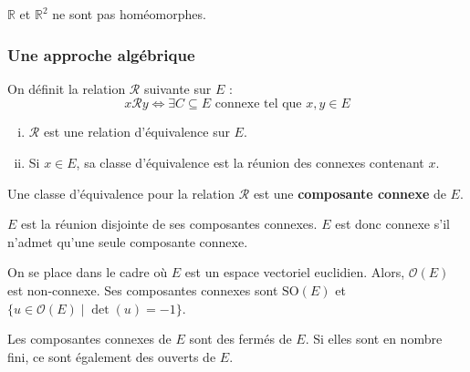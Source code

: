 	\begin{application}
		$\mathbb{R}$ et $\mathbb{R}^2$ ne sont pas homéomorphes.
	\end{application}
	
	\subsubsection{Une approche algébrique}
	
	\begin{definition}
		On définit la relation $\mathcal{R}$ suivante sur $E$ :
		\[ x \mathcal{R} y \iff \exists C \subseteq E \text{ connexe tel que } x, y \in E \]
	\end{definition}
	
	\begin{proposition}
		\begin{enumerate}[(i)]
			\item $\mathcal{R}$ est une relation d'équivalence sur $E$.
			\item Si $x \in E$, sa classe d'équivalence est la réunion des connexes contenant $x$.
		\end{enumerate}
	\end{proposition}
	
	\begin{definition}
		Une classe d'équivalence pour la relation $\mathcal{R}$ est une \textbf{composante connexe} de $E$.
	\end{definition}
	
	\begin{remark}
		$E$ est la réunion disjointe de ses composantes connexes. $E$ est donc connexe s'il n'admet qu'une seule composante connexe.
	\end{remark}
	
	
	\begin{example}
		On se place dans le cadre où $E$ est un espace vectoriel euclidien. Alors, $\mathcal{O}(E)$ est non-connexe. Ses composantes connexes sont $\mathrm{SO}(E)$ et $\{ u \in \mathcal{O}(E) \mid \det(u) = -1 \}$.
	\end{example}
	
	
	\begin{proposition}
		Les composantes connexes de $E$ sont des fermés de $E$. Si elles sont en nombre fini, ce sont également des ouverts de $E$. 
	\end{proposition}
	
